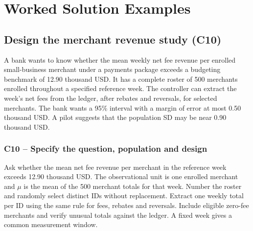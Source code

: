 	\section{Worked Solution Examples}
	\label{sec:worked-solution-examples}


	\subsection{Design the merchant revenue study (C10)}
	\label{prob:c10-1}

	A bank wants to know whether the mean weekly net fee revenue per enrolled small-business merchant under a payments package exceeds a budgeting benchmark of 12.90 thousand USD. It has a complete roster of 500 merchants enrolled throughout a specified reference week. The controller can extract the week's net fees from the ledger, after rebates and reversals, for selected merchants. The bank wants a 95\% interval with a margin of error at most 0.50 thousand USD. A pilot suggests that the population SD may be near 0.90 thousand USD.


	\clearpage

	\label{sol:c10-1-a}
	\subsubsection*{C10 -- Specify the question, population and design}

	Ask whether the mean net fee revenue per merchant in the reference week exceeds 12.90 thousand USD. The observational unit is one enrolled merchant and $\mu$ is the mean of the 500 merchant totals for that week. Number the roster and randomly select distinct IDs without replacement. Extract one weekly total per ID using the same rule for fees, rebates and reversals. Include eligible zero-fee merchants and verify unusual totals against the ledger. A fixed week gives a common measurement window.


